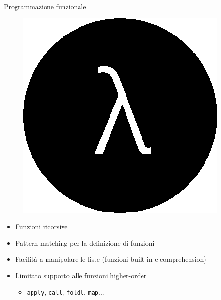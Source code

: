 \begin{frame}{Programmazione funzionale}

	\begin{figure}
		\hfill
		\includegraphics[scale=0.1]{res/lambda}
	\end{figure}

	\begin{itemize}
		\item Funzioni ricorsive
		\item Pattern matching per la definizione di funzioni
		\item Facilità a manipolare le liste (funzioni built-in e comprehension)
		\item Limitato supporto alle funzioni higher-order
			\begin{itemize}
				\item \texttt{apply}, \texttt{call}, \texttt{foldl}, \texttt{map}...
			\end{itemize}
	\end{itemize}


\end{frame}
